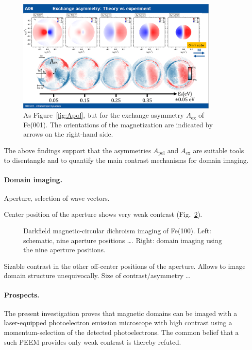 \documentclass[prl,twocolumn,floatfix]{revtex4-2}
\begin{document}
\begin{figure}
    \centering
    \includegraphics[width = 0.9\textwidth]{Aex}
    \caption{As Figure~\ref{fig:Apol}, but for the exchange asymmetry $A_{\mathrm{ex}}$ of Fe(001). The orientations of the magnetization are indicated by arrows on the right-hand side.}
    \label{fig:Aex}
\end{figure}

The above findings support that the asymmetries $A_{\mathrm{pol}}$ and $A_{\mathrm{ex}}$ are suitable tools to disentangle and to quantify the main contrast mechanisms for domain imaging. 

\paragraph{Domain imaging.} Aperture, selection of wave vectors.

Center position of the aperture shows very weak contrast (Fig.~\ref{fig:Imaging}).

\begin{figure}
    \centering
    \caption{Darkfield magnetic-circular dichroism imaging of Fe(100). Left: schematic, nine aperture positions \ldots. Right: domain imaging using the nine aperture positions.}
    \label{fig:Imaging}
\end{figure}

Sizable contrast in the other off-center positions of the aperture. Allows to image domain structure unequivocally. Size of contrast/asymmetry \ldots

\paragraph{Prospects.} The present investigation proves that magnetic domains can be imaged with a laser-equipped photoelectron emission microscope with high contrast using a momentum-selection of the detected photoelectrons. The common belief that a such PEEM provides only weak contrast is thereby refuted.
\end{document}

